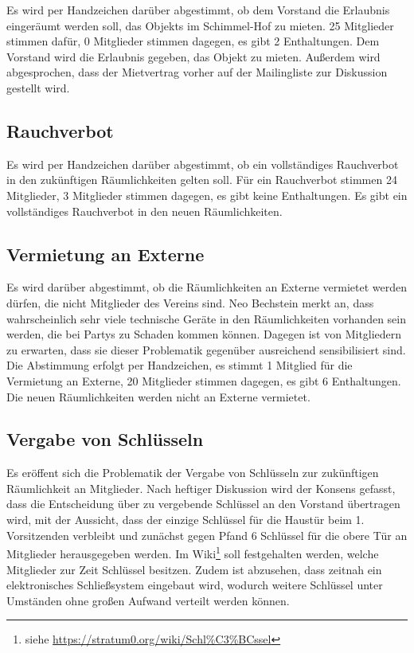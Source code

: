 \documentclass[a4paper,12pt]{scrartcl}
\begin{document}
Es wird per Handzeichen darüber abgestimmt, ob dem Vorstand die Erlaubnis
eingeräumt werden soll, das Objekts im Schimmel-Hof zu mieten. 25 Mitglieder
stimmen dafür, 0 Mitglieder stimmen dagegen, es gibt 2 Enthaltungen. Dem
Vorstand wird die Erlaubnis gegeben, das Objekt zu mieten. Außerdem wird
abgesprochen, dass der Mietvertrag vorher auf der Mailingliste zur Diskussion
gestellt wird.

\subsection{Rauchverbot}
Es wird per Handzeichen darüber abgestimmt, ob ein vollständiges Rauchverbot in
den zukünftigen Räumlichkeiten gelten soll. Für ein Rauchverbot stimmen 24
Mitglieder, 3 Mitglieder stimmen dagegen, es gibt keine Enthaltungen. Es gibt
ein vollständiges Rauchverbot in den neuen Räumlichkeiten.

\subsection{Vermietung an Externe}
Es wird darüber abgestimmt, ob die Räumlichkeiten an Externe vermietet werden
dürfen, die nicht Mitglieder des Vereins sind. Neo Bechstein merkt an, dass
wahrscheinlich sehr viele technische Geräte in den Räumlichkeiten vorhanden sein
werden, die bei Partys zu Schaden kommen können. Dagegen ist von Mitgliedern zu
erwarten, dass sie dieser Problematik gegenüber ausreichend sensibilisiert sind.
Die Abstimmung erfolgt per Handzeichen, es stimmt 1 Mitglied für die Vermietung
an Externe, 20 Mitglieder stimmen dagegen, es gibt 6 Enthaltungen. Die neuen
Räumlichkeiten werden nicht an Externe vermietet.

\subsection{Vergabe von Schlüsseln}
Es eröffent sich die Problematik der Vergabe von Schlüsseln zur zukünftigen
Räumlichkeit an Mitglieder. Nach heftiger Diskussion wird der Konsens gefasst,
dass die Entscheidung über zu vergebende Schlüssel an den Vorstand übertragen
wird, mit der Aussicht, dass der einzige Schlüssel für die Haustür beim 1.
Vorsitzenden verbleibt und zunächst gegen Pfand 6 Schlüssel für die obere Tür an
Mitglieder herausgegeben werden. Im Wiki\footnote{siehe %
\url{https://stratum0.org/wiki/Schl\%C3\%BCssel}} soll festgehalten werden,
welche Mitglieder zur Zeit Schlüssel besitzen. Zudem ist abzusehen, dass zeitnah
ein elektronisches Schließsystem eingebaut wird, wodurch weitere Schlüssel unter
Umständen ohne großen Aufwand verteilt werden können.
\end{document}
